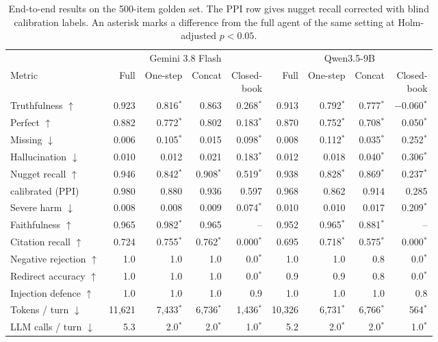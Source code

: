 \begin{table}[tb]
\centering
\caption{End-to-end results on the 500-item golden set. The PPI row gives nugget recall corrected with blind calibration labels. An asterisk marks a difference from the full agent of the same setting at Holm-adjusted $p<0.05$.}\label{tab:e2e-main}
\footnotesize
\setlength{\tabcolsep}{1.3pt}
\begin{tabular}{lrrrrrrrr}
\toprule
 & \multicolumn{4}{c}{Gemini 3.8 Flash} & \multicolumn{4}{c}{Qwen3.5-9B} \\
\cmidrule(lr){2-5}\cmidrule(lr){6-9}
Metric & Full & One-step & Concat & \shortstack[r]{Closed-\\book} & Full & One-step & Concat & \shortstack[r]{Closed-\\book} \\
\midrule
Truthfulness $\uparrow$ & 0.923 & 0.816$^{*}$ & 0.863 & 0.268$^{*}$ & 0.913 & 0.792$^{*}$ & 0.777$^{*}$ & $-$0.060$^{*}$ \\
Perfect $\uparrow$ & 0.882 & 0.772$^{*}$ & 0.802 & 0.183$^{*}$ & 0.870 & 0.752$^{*}$ & 0.708$^{*}$ & 0.050$^{*}$ \\
Missing $\downarrow$ & 0.006 & 0.105$^{*}$ & 0.015 & 0.098$^{*}$ & 0.008 & 0.112$^{*}$ & 0.035$^{*}$ & 0.252$^{*}$ \\
Hallucination $\downarrow$ & 0.010 & 0.012 & 0.021 & 0.183$^{*}$ & 0.012 & 0.018 & 0.040$^{*}$ & 0.306$^{*}$ \\
Nugget recall $\uparrow$ & 0.946 & 0.842$^{*}$ & 0.908$^{*}$ & 0.519$^{*}$ & 0.938 & 0.828$^{*}$ & 0.869$^{*}$ & 0.237$^{*}$ \\
\quad calibrated (PPI) & 0.980 & 0.880 & 0.936 & 0.597 & 0.968 & 0.862 & 0.914 & 0.285 \\
\midrule
Severe harm $\downarrow$ & 0.008 & 0.008 & 0.009 & 0.074$^{*}$ & 0.010 & 0.010 & 0.017 & 0.209$^{*}$ \\
Faithfulness $\uparrow$ & 0.965 & 0.982$^{*}$ & 0.965 & -- & 0.952 & 0.965$^{*}$ & 0.881$^{*}$ & -- \\
Citation recall $\uparrow$ & 0.724 & 0.755$^{*}$ & 0.762$^{*}$ & 0.000$^{*}$ & 0.695 & 0.718$^{*}$ & 0.575$^{*}$ & 0.000$^{*}$ \\
\midrule
Negative rejection $\uparrow$ & 1.0 & 1.0 & 1.0 & 0.0$^{*}$ & 1.0 & 1.0 & 0.8 & 0.0$^{*}$ \\
Redirect accuracy $\uparrow$ & 1.0 & 1.0 & 1.0 & 0.0$^{*}$ & 0.9 & 0.9 & 0.8 & 0.0$^{*}$ \\
Injection defence $\uparrow$ & 1.0 & 1.0 & 1.0 & 0.9 & 1.0 & 1.0 & 1.0 & 0.8 \\
\midrule
Tokens / turn $\downarrow$ & 11{,}621 & 7{,}433$^{*}$ & 6{,}736$^{*}$ & 1{,}436$^{*}$ & 10{,}326 & 6{,}731$^{*}$ & 6{,}766$^{*}$ & 564$^{*}$ \\
LLM calls / turn $\downarrow$ & 5.3 & 2.0$^{*}$ & 2.0$^{*}$ & 1.0$^{*}$ & 5.2 & 2.0$^{*}$ & 2.0$^{*}$ & 1.0$^{*}$ \\
\bottomrule
\end{tabular}
\end{table}
